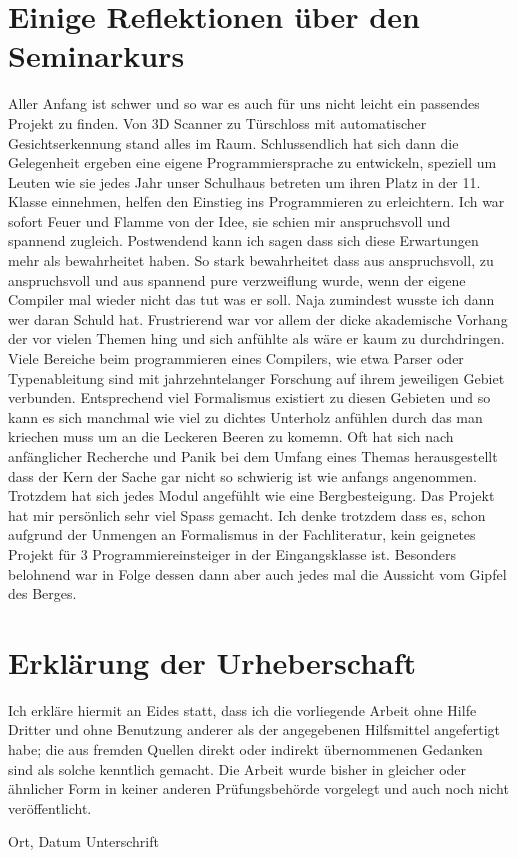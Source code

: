 \documentclass[a4paper, 12pt]{article}
\begin{document}
\newpage
\section{Einige Reflektionen \"uber den Seminarkurs}
Aller Anfang ist schwer und so war es auch f\"ur uns nicht leicht ein passendes Projekt zu finden. Von 3D Scanner zu T\"urschloss mit automatischer
Gesichtserkennung stand alles im Raum. Schlussendlich hat sich dann die Gelegenheit ergeben eine eigene Programmiersprache zu entwickeln, speziell um
Leuten wie sie jedes Jahr unser Schulhaus betreten um ihren Platz in der 11.
Klasse einnehmen, helfen den Einstieg ins Programmieren zu erleichtern. Ich
war sofort Feuer und Flamme von der Idee, sie schien mir anspruchsvoll und
spannend zugleich. Postwendend kann ich sagen dass sich diese Erwartungen
mehr als bewahrheitet haben. So stark bewahrheitet dass aus anspruchsvoll,
zu anspruchsvoll und aus spannend pure verzweiflung wurde, wenn der eigene Compiler mal wieder nicht das tut was er soll. Naja zumindest wusste ich dann wer daran Schuld hat. Frustrierend war vor allem der dicke akademische Vorhang der vor vielen Themen hing und sich anf\"uhlte als w\"are er
kaum zu durchdringen. Viele Bereiche beim programmieren eines Compilers,
wie etwa Parser oder Typenableitung sind mit jahrzehntelanger Forschung auf
ihrem jeweiligen Gebiet verbunden. Entsprechend viel Formalismus existiert zu
diesen Gebieten und so kann es sich manchmal wie viel zu dichtes Unterholz
anf\"uhlen durch das man kriechen muss um an die Leckeren Beeren zu komemn. Oft hat sich nach anf\"anglicher Recherche und Panik bei dem Umfang
eines Themas herausgestellt dass der Kern der Sache gar nicht so schwierig ist
wie anfangs angenommen. Trotzdem hat sich jedes Modul angef\"uhlt wie eine
Bergbesteigung. Das Projekt hat mir pers\"onlich sehr viel Spass gemacht.
Ich denke trotzdem dass es, schon aufgrund der Unmengen an Formalismus in der Fachliteratur, kein geignetes Projekt f\"ur 3 Programmiereinsteiger in der Eingangsklasse ist.
Besonders belohnend war in Folge dessen dann aber auch jedes mal die Aussicht vom Gipfel des Berges.

\newpage
\section{Erklärung der Urheberschaft}

Ich erkläre hiermit an Eides statt, dass ich die vorliegende Arbeit
ohne Hilfe Dritter und ohne Benutzung anderer als der angegebenen
Hilfsmittel angefertigt habe; die aus fremden Quellen direkt oder
indirekt übernommenen Gedanken sind als solche kenntlich gemacht. Die
Arbeit wurde bisher in gleicher oder ähnlicher Form in keiner anderen
Prüfungsbehörde vorgelegt und auch noch nicht veröffentlicht.

\vspace{4cm}

\hspace{2cm} Ort, Datum \hfill Unterschrift \hspace{2cm}
\newpage
\printbibliography
\nocite{*}
\end{document}
